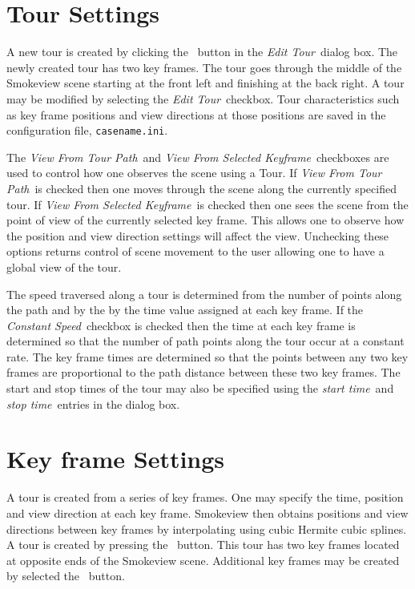 \documentclass[11pt,twoside]{book}
\newcommand{\frameit}[1]{\fbox{\tt #1}}
\begin{document}
\section{Tour Settings}
A new tour is created
by clicking the \frameit{New Tour}\ button in the {\em Edit Tour}\ dialog box.
The newly created tour has two key frames.  The tour
goes through the middle of the Smokeview scene starting at the
front left and finishing at the back right.
A tour may be modified by selecting the {\em Edit Tour}\ checkbox.
Tour characteristics such as key frame positions and view directions at those positions
are saved in the configuration file, {\tt casename.ini}.

The {\em View From Tour Path}\ and  {\em
View From Selected Keyframe}\ checkboxes are used to control how one observes the
scene using a Tour.  If {\em View From Tour Path}\ is checked then one moves through the
scene along the currently specified tour.  If {\em
View From Selected Keyframe}\ is checked then one sees the scene from the point of view of the
currently selected key frame.  This allows one to observe how the position and view direction settings will affect the view.  Unchecking these options
returns control of scene movement to the user allowing one to have a global view of the tour.

The speed traversed along a tour is determined from the number of points along the path
and by the by the time value
assigned at each key frame.   If the {\em Constant Speed}\ checkbox
is checked then the time at each key frame is determined so that the number of path points along the tour occur at a constant rate.  The key frame times are determined so that the
points between any two key frames are proportional to the path distance between these two key frames.
The start and stop times of the tour may also be specified using the {\em start time}\ and
{\em stop time}\ entries in the dialog box.


\section{Key frame Settings}
A tour is created from a series of key frames.  One may specify
 the time, position and view direction at each key frame.  Smokeview then
obtains positions and view directions between key frames by interpolating
using cubic Hermite cubic splines.
A tour is created by pressing the
\frameit{Add Tour}\ button.  This tour has two key frames located
at opposite ends of the Smokeview scene.  Additional key frames may
be created by selected the \frameit{Add}\ button.
\end{document}

